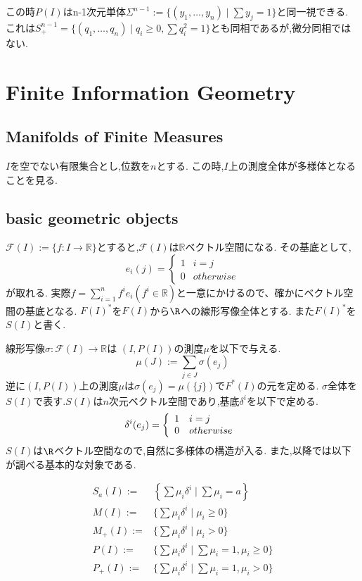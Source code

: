 \documentclass[dvipdfmx]{ujarticle}
\begin{document}
この時$P(I)$はn-1次元単体$\Sigma^{n-1}:=\{(y_1, \ldots, y_n)\mid \sum y_j = 1\}$と同一視できる.
これは$S^{n-1}_{+}=\{(q_1, \ldots, q_n) \mid q_i \ge 0, \sum q_i^2 = 1\}$とも同相であるが,微分同相ではない.

\section{Finite Information Geometry}
\subsection{Manifolds of Finite Measures}
$I$を空でない有限集合とし,位数を$n$とする.
この時,$I$上の測度全体が多様体となることを見る.
\subsection{basic geometric objects}
$\mathcal{F}(I):=\{f:I \to \mathbb{R}\}$とすると,$\mathcal{F}(I)$は$\mathbb{R}$ベクトル空間になる.
その基底として,
$$
e_i(j) = \left\{
\begin{array}{ll}
1 & i = j \\
0 & otherwise
\end{array}
\right.
$$
が取れる.
実際$f = \sum_{i=1}^n f^i e_i(f^i \in \mathbb{R})$と一意にかけるので、確かにベクトル空間の基底となる.
$F(I)^*$を$F(I)$から$\R$への線形写像全体とする.
また$F(I)^*$を$S(I)$と書く.

線形写像$\sigma: \mathcal{F}(I) \to \mathbb{R}$は
$(I, P(I))$の測度$\mu$を以下で与える.
$$
\mu(J) := \sum_{j \in J} \sigma(e_j)
$$
逆に$(I, P(I))$上の測度$\mu$は$\sigma(e_j) = \mu(\{j\})$で$F^*(I)$の元を定める.
$\sigma$全体を$S(I)$で表す.$S(I)$は$n$次元ベクトル空間であり,基底$\delta^i$を以下で定める.
$$
\delta^i(e_j) = \left\{
\begin{array}{ll}
1 & i = j \\
0 & otherwise
\end{array}
\right. \\
$$
$S(I)$は$\R$ベクトル空間なので,自然に多様体の構造が入る.
また,以降では以下が調べる基本的な対象である.

\begin{align*}
S_a(I):= & \left\{\sum \mu_i \delta^i \mid \sum \mu_i = a\right\} \\
M(I):= & \{\sum \mu_i \delta^i \mid \mu_i \ge 0\} \\
M_{+}(I):= & \{\sum \mu_i \delta^i \mid \mu_i > 0\} \\
P(I):= & \{\sum \mu_i \delta^i \mid \sum \mu_i = 1, \mu_i \ge 0\} \\
P_{+}(I):= & \{\sum \mu_i \delta^i \mid \sum \mu_i = 1, \mu_i > 0\}
\end{align*}
\end{document}

